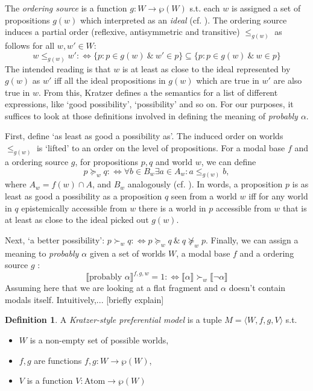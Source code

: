 \documentclass{article}
\theoremstyle{definition}
\newtheorem{definition}{Definition}
\newcommand{\lb}{\llbracket}
\newcommand{\rb}{\rrbracket}
\begin{document}
The \emph{ordering source} is a function $g: W \rightarrow \wp(W)$ s.t. each $w$ is assigned a set of propositions $g(w)$ which interpreted as an \emph{ideal} (cf. \cite{lewis81_order_seman_premis_seman_count}). The ordering source induces a partial order (reflexive, antisymmetric and transitive) $\leq_{g(w)}$ as follows for all $w,w' \in W$: 
\begin{equation}
    \label{eq:porder}
w \leq_{g(w)} w' :\iff \{p: p\in g(w) ~\&~ w' \in p\} \subseteq \{p: p\in  g(w) ~\&~ w \in p\}
\end{equation}
The intended reading is that $w$ is at least as close to the ideal represented by $g(w)$ as $w'$ iff all the ideal propositions in $g(w)$ which are true in $w'$ are also true in $w$.
From this, Kratzer defines a the semantics for a list of different expressions, like `good possibility', `possibility' and so on.
For our purposes, it suffices to look at those definitions involved in defining the meaning of \emph{probably $\alpha$}.

First, define `as least as good a possibility as'.
The induced order on worlds $\leq_{g(w)}$ is `lifted' to an order on the level of propositions.
For a modal base $f$ and a ordering source $g$, for propositions $p,q$ and world $w$, we can define
\begin{equation}
    \label{eq:lifted}
    p \succeq_w q :\iff \forall b \in B_w \exists a \in A_w: a \leq_{g(w)} b,
\end{equation}
where $A_w = f(w) \cap A$, and $B_w$ analogously (cf. \cite[][p.~519]{holliday13_measur}).
In words, a proposition $p$ is as least as good a possibility as a proposition $q$ seen from a world $w$ iff for any world in $q$ epistemically accessible from $w$ there is a world in $p$ accessible from $w$ that is at least as close to the ideal picked out $g(w)$.

Next, `a better possibility': $p \succ_w q :\iff p \succeq_w q ~\&~ q \not\succeq_w p$.  
Finally, we can assign a meaning to \emph{probably $\alpha$} given a set of worlds $W$, a modal base $f$ and a ordering source $g$ \parencite[][p.~645]{kratzer91_modal}:
\begin{equation}
\llbracket \text{probably } \alpha \rrbracket^{f,g,w} = 1 :\iff \lb \alpha \rb \succ_w \lb \neg\alpha \rb
\end{equation}
Assuming here that we are looking at a flat fragment and $\alpha$ doesn't contain modals itself.
Intuitively,... [briefly explain]

\begin{definition}
    A \emph{Kratzer-style preferential model} is a tuple $M = \langle W,f,g,V \rangle$ s.t.
    \begin{itemize}[nosep]
\renewcommand\labelitemi{--}
      \item $W$ is a non-empty set of possible worlds,
      \item $f,g$ are functions $f,g: W \rightarrow \wp(W)$,
      \item $V$ is a function $V: \text{Atom} \rightarrow \wp(W)$
    \end{itemize}
\end{definition}
\end{document}
